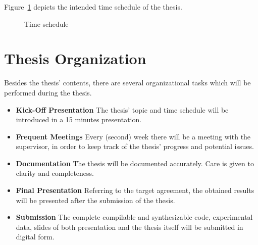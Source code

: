 \documentclass[12pt,twoside,doublepage]{article}
\begin{document}
Figure~\ref{fig:schedule} depicts the intended time schedule of the thesis.
 
\begin{figure}[!ht]
        \caption{Time schedule}
        \label{fig:schedule}
\end{figure}
 
 
\section{Thesis Organization}
\label{sec:orga}
Besides the thesis' contents, there are several organizational tasks which will be performed during the thesis.
\begin{itemize}
\item{\bf Kick-Off Presentation}
The thesis' topic and time schedule will be introduced in a 15 minutes presentation.
 
\item{\bf Frequent Meetings}
Every (second) week there will be a meeting with the supervisor, in order to keep track of the thesis' progress and potential issues.
 
\item{\bf Documentation}
The thesis will be documented accurately. Care is given to clarity and completeness.
 
\item{\bf Final Presentation}
Referring to the target agreement, the obtained results will be presented after the submission of the thesis.
 
\item{\bf Submission}
The complete compilable and synthesizable code, experimental data, slides of both presentation and the thesis itself will be submitted in digital form.
\end{itemize}
 


 
\end{document}

